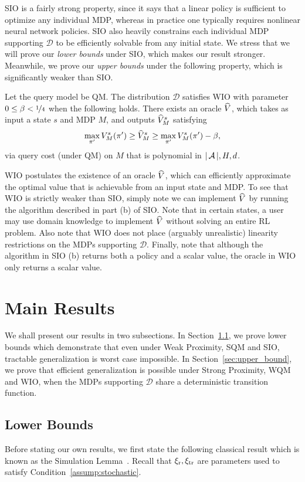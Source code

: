 \documentclass[11pt,twoside]{article}
\begin{document}
SIO is a fairly strong property, since it says that a linear policy is sufficient to optimize any individual MDP, whereas in practice one typically requires nonlinear neural network policies. SIO also heavily constrains each individual MDP supporting $\mathcal{D}$ to be efficiently solvable from any initial state. We stress that we will prove our \emph{lower bounds} under SIO, which makes our result stronger. Meanwhile, we prove our \emph{upper bounds} under the following property, which is significantly weaker than SIO.

\begin{property}
Let the query model be QM. The distribution $\mathcal{D}$ satisfies WIO with parameter $0 \leq \beta < \nicefrac{1}{4}$ when the following holds. There exists an oracle $\widehat{V}$, which takes as input a state $s$ and MDP $M$, and outputs $\widehat{V}^{{s }}_{{M }}$ satisfying
$$
\max_{\pi'} V^{{s }}_{{M }}({\pi'}) \geq \widehat{V}^{{s }}_{{M }} \geq \max_{\pi'} V^{{s }}_{{M }}({\pi'}) - \operatorname{\beta},
$$
via query cost (under QM) on $M$ that is polynomial in $\vert \operatorname{\mathcal{A}} \vert, H, d$.
\end{property}
WIO postulates the existence of an oracle $\widehat{V}$, which can efficiently approximate the optimal value that is achievable from an input state and MDP. To see that WIO is strictly weaker than SIO, simply note we can implement $\widehat{V}$ by running the algorithm described in part (b) of SIO. Note that in certain states, a user may use domain knowledge to implement $\widehat{V}$ without solving an entire RL problem. Also note that WIO does not place (arguably unrealistic) linearity restrictions on the MDPs supporting $\mathcal{D}$. Finally, note that although the algorithm in SIO (b) returns both a policy and a scalar value, the oracle in WIO only returns a scalar value.

\section{Main Results}
\label{sec:results}
We shall present our results in two subsections. In Section~\ref{sec:lower_bounds}, we prove lower bounds which demonstrate that even under Weak Proximity, SQM and SIO, tractable generalization is worst case impossible. In Section~\ref{sec:upper_bound}, we prove that efficient generalization is possible under Strong Proximity, WQM and WIO, when the MDPs supporting $\mathcal{D}$ share a deterministic transition function.

\subsection{Lower Bounds}
\label{sec:lower_bounds}
Before stating our own results, we first state the following classical result which is known as the Simulation Lemma~\citep{kearns99, kearns02, brafman03, kakade03, abbeel05}. Recall that $\operatorname{\xi_r}, \operatorname{\xi_{tr}}$ are parameters used to satisfy Condition~\ref{assump:stochastic}.
\end{document}
